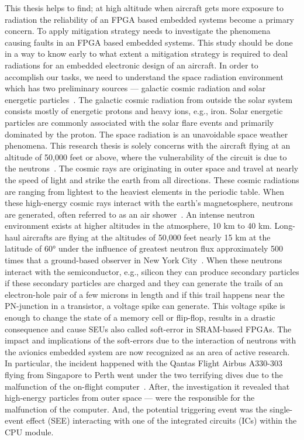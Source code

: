 This thesis helps to find; at high altitude when aircraft gets more exposure to radiation the reliability of an FPGA based embedded systems become a primary concern. To apply mitigation strategy needs to investigate the phenomena causing faults in an FPGA based embedded systems. This study should be done in a way to know early to what extent a mitigation strategy is required to deal radiations for an embedded electronic design of an aircraft.
In order to accomplish our tasks, we need to understand the space radiation environment which has two preliminary sources --- galactic cosmic radiation and solar energetic particles~\citep{SWE20216}. The galactic cosmic radiation from outside the solar system consists mostly of energetic protons and heavy ions, e.g., iron. Solar energetic particles are commonly associated with the solar flare events and primarily dominated by the proton.  The space radiation is an unavoidable space weather phenomena. This research thesis is solely concerns with the aircraft flying at an altitude of 50,000 feet or above, where the vulnerability of the circuit is due to the neutrons~\citep{xilinnseu}. The cosmic rays are originating in outer space and travel at nearly the speed of light and strike the earth from all directions. These cosmic radiations are ranging from lightest to the heaviest elements in the periodic table. When these high-energy cosmic rays interact with the earth's magnetosphere, neutrons are generated, often referred to as an air shower~\citep{lesea2005rosetta}.  An intense neutron environment exists at higher altitudes in the atmosphere, 10 km to 40 km.  Long-haul aircrafts are flying at the altitudes of 50,000 feet nearly 15 km at the latitude of \ang{60} under the influence of greatest neutron flux approximately 500 times that a ground-based observer in New York City~\citep{lesea2005rosetta}. When these neutrons interact with the semiconductor, e.g., silicon they can produce secondary particles if these secondary particles are charged and they can generate the trails of an electron-hole pair of a few microns in length and if this trail happens near the PN-junction in a transistor, a voltage spike can generate. This voltage spike is enough to change the state of a memory cell or flip-flop, results in a drastic consequence and cause SEUs also called soft-error in SRAM-based FPGAs. The impact and implications of the soft-errors due to the interaction of neutrons with the avionics embedded system are now recognized as an area of active research. In particular, the incident happened with the Qantas Flight Airbus A330-303 flying from Singapore to Perth went under the two terrifying dives due to the malfunction of the on-flight computer~\citep{SWE20216}. After, the investigation it revealed that high-energy particles from outer space --- were the responsible for the malfunction of the computer. And, the potential triggering event was the single-event effect (SEE) interacting with one of the integrated circuits (ICs) within the CPU module. 


